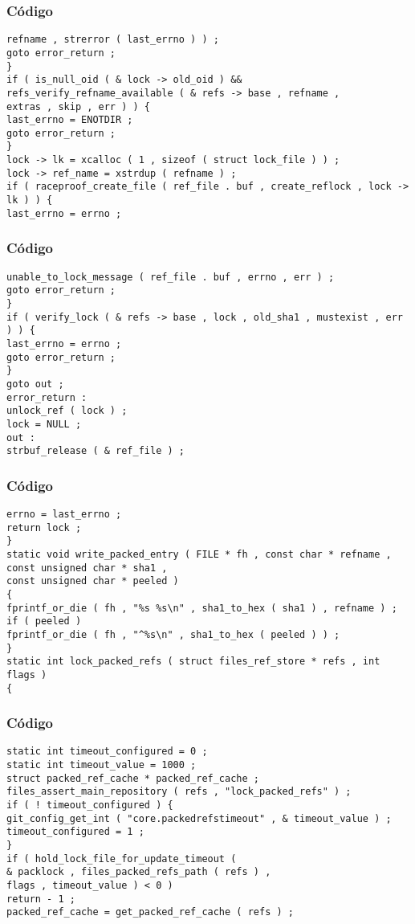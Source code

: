 \documentclass{beamer}
\begin{document}
\begin{frame}[fragile]
\frametitle{C\'odigo}
\begin{verbatim}
refname , strerror ( last_errno ) ) ; 
goto error_return ; 
} 
if ( is_null_oid ( & lock -> old_oid ) && 
refs_verify_refname_available ( & refs -> base , refname , 
extras , skip , err ) ) { 
last_errno = ENOTDIR ; 
goto error_return ; 
} 
lock -> lk = xcalloc ( 1 , sizeof ( struct lock_file ) ) ; 
lock -> ref_name = xstrdup ( refname ) ; 
if ( raceproof_create_file ( ref_file . buf , create_reflock , lock -> lk ) ) { 
last_errno = errno ; 
\end{verbatim}
\end{frame}
\begin{frame}[fragile]
\frametitle{C\'odigo}
\begin{verbatim}
unable_to_lock_message ( ref_file . buf , errno , err ) ; 
goto error_return ; 
} 
if ( verify_lock ( & refs -> base , lock , old_sha1 , mustexist , err ) ) { 
last_errno = errno ; 
goto error_return ; 
} 
goto out ; 
error_return : 
unlock_ref ( lock ) ; 
lock = NULL ; 
out : 
strbuf_release ( & ref_file ) ; 
\end{verbatim}
\end{frame}
\begin{frame}[fragile]
\frametitle{C\'odigo}
\begin{verbatim}
errno = last_errno ; 
return lock ; 
} 
static void write_packed_entry ( FILE * fh , const char * refname , 
const unsigned char * sha1 , 
const unsigned char * peeled ) 
{ 
fprintf_or_die ( fh , "%s %s\n" , sha1_to_hex ( sha1 ) , refname ) ; 
if ( peeled ) 
fprintf_or_die ( fh , "^%s\n" , sha1_to_hex ( peeled ) ) ; 
} 
static int lock_packed_refs ( struct files_ref_store * refs , int flags ) 
{ 
\end{verbatim}
\end{frame}
\begin{frame}[fragile]
\frametitle{C\'odigo}
\begin{verbatim}
static int timeout_configured = 0 ; 
static int timeout_value = 1000 ; 
struct packed_ref_cache * packed_ref_cache ; 
files_assert_main_repository ( refs , "lock_packed_refs" ) ; 
if ( ! timeout_configured ) { 
git_config_get_int ( "core.packedrefstimeout" , & timeout_value ) ; 
timeout_configured = 1 ; 
} 
if ( hold_lock_file_for_update_timeout ( 
& packlock , files_packed_refs_path ( refs ) , 
flags , timeout_value ) < 0 ) 
return - 1 ; 
packed_ref_cache = get_packed_ref_cache ( refs ) ; 
\end{verbatim}
\end{frame}
\end{document}
